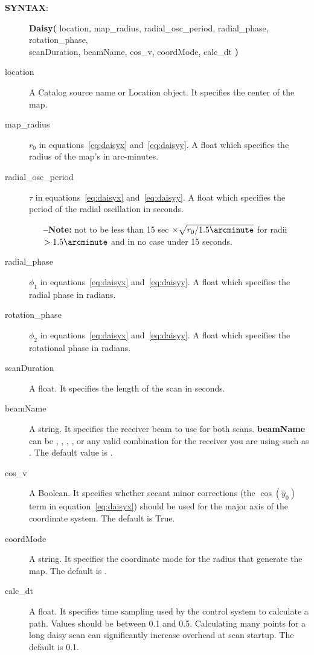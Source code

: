 \begin{description}
\item[{\bf SYNTAX}:]
{\bfseries{\textcolor{pythonKeywords}{Daisy}}(}
location, map\_radius, radial\_osc\_period, radial\_phase, rotation\_phase,\\
scanDuration, beamName, cos\_v, coordMode, calc\_dt
{\bf)}
\item[location] A Catalog source name or Location object. It specifies the 
center of the map.
\item[map\_radius] $r_{0}$ in equations~\ref{eq:daisyx} and~\ref{eq:daisyy}.
A float which specifies the radius of the map's  in arc-minutes.
\item[radial\_osc\_period] $\tau$ in equations~\ref{eq:daisyx} and~\ref{eq:daisyy}.
A float which specifies the period of the radial oscillation in seconds.
\begin{itemize}
\item[{\bf --Note:}] not to be less than 15 sec $\times \sqrt{r_{0}/1.5\arcminute}$
for radii $>1.5\arcminute$ and in no case under 15 seconds.
\end{itemize}
\item[radial\_phase] $\phi_{1}$ in equations~\ref{eq:daisyx} and~\ref{eq:daisyy}.
A float which specifies the radial phase in radians.
\item[rotation\_phase] $\phi_{2}$ in equations~\ref{eq:daisyx} and~\ref{eq:daisyy}.
A float which specifies the rotational phase in radians.
\item[scanDuration] A float. It specifies the length of the scan in seconds.
\item[beamName] A string. It specifies the receiver beam to use for both 
scans. {\bf beamName} can be , , , ,  or any valid combination 
for the receiver you are using such as . The default value is .
\item[cos\_v] A Boolean. It specifies whether secant minor corrections (the
$\cos(\hat{y}_{0})$ term in equation~\ref{eq:daisyx}) should be used for the major axis
of the coordinate system.  The default is True.
\item[coordMode] A string. It specifies the coordinate mode for the radius that generate
the map. The default is .
\item[calc\_dt] A float. It specifies time sampling used by the control system to calculate
a path.  Values should be between 0.1 and 0.5.  Calculating many points for a long daisy scan
can significantly increase overhead at scan startup.  The default is 0.1.


\end{description}
